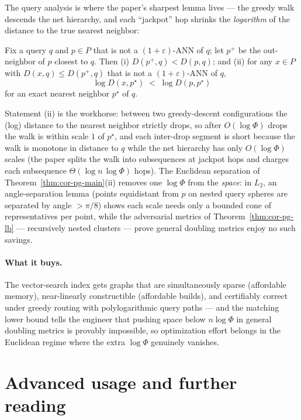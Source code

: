 The query analysis is where the paper's sharpest lemma lives --- the
greedy walk descends the net hierarchy, and each ``jackpot'' hop
shrinks the \emph{logarithm} of the distance to the true nearest
neighbor:

\begin{lemma}\label{lem:cor-pg-drop}
Fix a query $q$ and $p \in P$ that is not a $(1+\varepsilon)$-ANN of
$q$; let $p^+$ be the out-neighbor of $p$ closest to $q$. Then (i)
$D(p^+, q) < D(p, q)$; and (ii) for any $x \in P$ with $D(x,q) \le
D(p^+,q)$ that is not a $(1+\varepsilon)$-ANN of $q$,
\[
\log D(x, p^{\star}) \;<\; \log D(p, p^{\star})
\]
for an exact nearest neighbor $p^{\star}$ of $q$. \eop
\end{lemma}

Statement (ii) is the workhorse: between two greedy-descent
configurations the (log) distance to the nearest neighbor strictly
drops, so after $O(\log\Phi)$ drops the walk is within scale $1$ of
$p^{\star}$, and each inter-drop segment is short because the walk is
monotone in distance to $q$ while the net hierarchy has only
$O(\log\Phi)$ scales (the paper splits the walk into subsequences at
jackpot hops and charges each subsequence $\Theta(\log n\,\log\Phi)$
hops). The Euclidean separation of Theorem~\ref{thm:cor-pg-main}(ii)
removes one $\log\Phi$ from the \emph{space}: in $L_2$, an
angle-separation lemma (points equidistant from $p$ on nested query
spheres are separated by angle $> \pi/8$) shows each scale needs only
a bounded cone of representatives per point, while the adversarial
metrics of Theorem~\ref{thm:cor-pg-lb} --- recursively nested clusters
--- prove general doubling metrics enjoy no such savings.

\paragraph{What it buys.}
The vector-search index gets graphs that are simultaneously sparse
(affordable memory), near-linearly constructible (affordable builds),
and certifiably correct under greedy routing with polylogarithmic query
paths --- and the matching lower bound tells the engineer that pushing
space below $n\log\Phi$ in general doubling metrics is provably
impossible, so optimization effort belongs in the Euclidean regime
where the extra $\log\Phi$ genuinely vanishes.

\section{Advanced usage and further reading}
\label{sec:cor-advanced}

